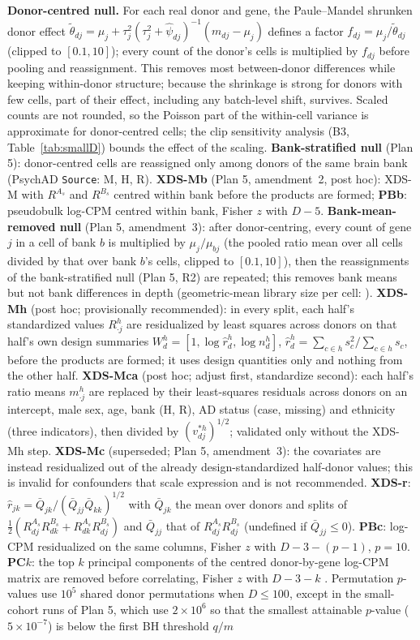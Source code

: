 \textbf{Donor-centred null.} For each real donor and gene, the Paule--Mandel shrunken donor effect $\tilde\theta_{dj}=\mu_j+\tau_j^2(\tau_j^2+\hat\psi_{dj})^{-1}(m_{dj}-\mu_j)$ defines a factor $f_{dj}=\mu_j/\tilde\theta_{dj}$ (clipped to $[0.1,10]$); every count of the donor's cells is multiplied by $f_{dj}$ before pooling and reassignment. This removes most between-donor differences while keeping within-donor structure; because the shrinkage is strong for donors with few cells, part of their effect, including any batch-level shift, survives. Scaled counts are not rounded, so the Poisson part of the within-cell variance is approximate for donor-centred cells; the clip sensitivity analysis (B3, Table~\ref{tab:smallD}) bounds the effect of the scaling. \textbf{Bank-stratified null} (Plan 5): donor-centred cells are reassigned only among donors of the same brain bank (PsychAD \texttt{Source}: M, H, R). \textbf{XDS-Mb} (Plan 5, amendment~2, post hoc): XDS-M with $R^{A_s}$ and $R^{B_s}$ centred within bank before the products are formed; \textbf{PBb}: pseudobulk log-CPM centred within bank, Fisher $z$ with $D-5$. \textbf{Bank-mean-removed null} (Plan 5, amendment~3): after donor-centring, every count of gene $j$ in a cell of bank $b$ is multiplied by $\mu_j/\mu_{bj}$ (the pooled ratio mean over all cells divided by that over bank $b$'s cells, clipped to $[0.1,10]$), then the reassignments of the bank-stratified null (Plan 5, R2) are repeated; this removes bank means but not bank differences in depth (geometric-mean library size per cell: \BmDepth). \textbf{XDS-Mh} (post hoc; provisionally recommended): in every split, each half's standardized values $R^h_{\cdot j}$ are residualized by least squares across donors on that half's own design summaries $W^h_d=[1,\log\hat r^h_d,\log n^h_d]$, $\hat r^h_d=\sum_{c\in h}s_c^2/\sum_{c\in h}s_c$, before the products are formed; it uses design quantities only and nothing from the other half. \textbf{XDS-Mca} (post hoc; adjust first, standardize second): each half's ratio means $m^h_{\cdot j}$ are replaced by their least-squares residuals across donors on an intercept, male sex, age, bank (H, R), AD status (case, missing) and ethnicity (three indicators), then divided by $(v^{*h}_{dj})^{1/2}$; validated only without the XDS-Mh step. \textbf{XDS-Mc} (superseded; Plan 5, amendment~3): the covariates are instead residualized out of the already design-standardized half-donor values; this is invalid for confounders that scale expression and is not recommended. \textbf{XDS-r}: $\hat r_{jk}=\bar Q_{jk}/(\bar Q_{jj}\bar Q_{kk})^{1/2}$ with $\bar Q_{jk}$ the mean over donors and splits of $\tfrac12(R^{A_s}_{dj}R^{B_s}_{dk}+R^{A_s}_{dk}R^{B_s}_{dj})$ and $\bar Q_{jj}$ that of $R^{A_s}_{dj}R^{B_s}_{dj}$ (undefined if $\bar Q_{jj}\le0$). \textbf{PBc}: log-CPM residualized on the same columns, Fisher $z$ with $D-3-(p-1)$, $p=10$. \textbf{PC$k$}: the top $k$ principal components of the centred donor-by-gene log-CPM matrix are removed before correlating, Fisher $z$ with $D-3-k$ \citep{Parsana2019}. Permutation $p$-values use $10^5$ shared donor permutations when $D\le100$, except in the small-cohort runs of Plan 5, which use $2\times10^6$ so that the smallest attainable $p$-value ($5\times10^{-7}$) is below the first BH threshold $q/m$ 